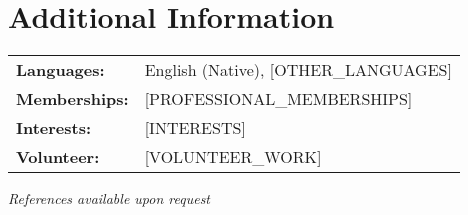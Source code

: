 \documentclass[12pt,letterpaper]{article}
\begin{document}
\section{Additional Information}
\begin{tabularx}{\textwidth}{lX}
\textbf{\color{darkgray}Languages:} & English (Native), [OTHER_LANGUAGES] \\
\textbf{\color{darkgray}Memberships:} & [PROFESSIONAL_MEMBERSHIPS] \\
\textbf{\color{darkgray}Interests:} & [INTERESTS] \\
\textbf{\color{darkgray}Volunteer:} & [VOLUNTEER_WORK] \\
\end{tabularx}

\vfill
\begin{center}
    \color{lightgray}\small
    \textit{References available upon request}
\end{center}
\end{document}
